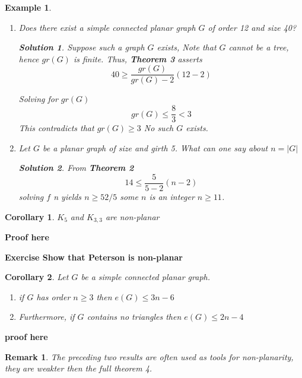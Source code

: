 \documentclass[12pt]{article}
\newtheorem*{corollary}{Corollary}
\newtheorem{example}{Example}
\newtheorem*{remark}{Remark}
\newtheorem{solution}{Solution}
\begin{document}
\begin{example}

\begin{enumerate}


\item  Does there exist a simple connected planar graph $G$ of order 12 and size 40?
\begin{solution}

  Suppose such a graph $G$ exists, Note that $G$ cannot be a tree, hence  $gr(G)$ is finite. Thus, \textbf{Theorem 3} asserts
  \[40 \ge \frac{gr(G)}{gr(G) - 2} (12 - 2)\]

Solving for $gr(G)$
\[gr(G) \le \frac{8}{3} < 3\]
This contradicts that $gr(G) \ge 3$ No such $G$ exists.
\end{solution}

\item Let $G$ be a planar graph of size  and girth 5. What can one  say about $n = \vert G\vert$

\begin{solution}
  From \textbf{Theorem 2}
  \[14 \le \frac{5}{5-2} (n-2)\]
solving $f$ n yields $n\ge 52/5$ some $n$ is an integer $n\ge 11$.
        \end{solution}
\end{enumerate}
\end{example}


\begin{corollary}
$K_{5}$ and $K_{3,3}$ are non-planar
\end{corollary}


\textbf{Proof here}


\textbf{Exercise Show that Peterson is non-planar}


\begin{corollary}
  Let $G$ be a simple connected planar graph.
  \begin{enumerate}
    \item if $G$ has order $n\ge 3$ then $e(G) \le 3n - 6$
          \item Furthermore, if $G$ contains no triangles then $e(G) \le 2n - 4$
  \end{enumerate}

\end{corollary}

\textbf{proof here}


\begin{remark}
The preceding two results are often used as tools for non-planarity, they are weakter then the full theorem 4.
\end{remark}
\end{document}

